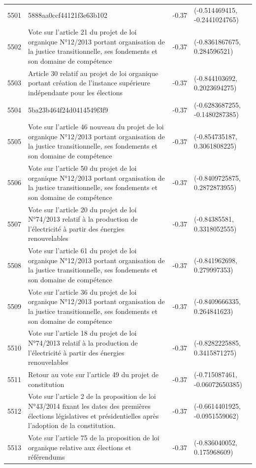 \begin{table}[ht]
\begin{tabular}{rlrl}
  5501 & 5888aa0ccf44121f3e63b102 & -0.37 & (-0.514469415, -0.2441024765) \\ 
  5502 & Vote sur l'article 21 du projet de loi organique N°12/2013 portant organisation de la justice transitionnelle, ses fondements et son domaine de compétence & -0.37 & (-0.8361867675, 0.284596521) \\ 
  5503 & Article 30 relatif au projet de loi organique portant création de l'instance supérieure indépendante pour les élections & -0.37 & (-0.844103692, 0.2023694275) \\ 
  5504 & 5ba23b464f24d0414549f3f9 & -0.37 & (-0.6283687255, -0.1480287385) \\ 
  5505 & Vote sur l'article 46 nouveau du projet de loi organique N°12/2013 portant organisation de la justice transitionnelle, ses fondements et son domaine de compétence & -0.37 & (-0.854735187, 0.3061808225) \\ 
  5506 & Vote sur l'article 50 du projet de loi organique N°12/2013 portant organisation de la justice transitionnelle, ses fondements et son domaine de compétence & -0.37 & (-0.8409725875, 0.2872873955) \\ 
  5507 & Vote sur l'article 20 du projet de loi N°74/2013 relatif à la production de l'électricité à partir des énergies renouvelables & -0.37 & (-0.84385581, 0.3318052555) \\ 
  5508 & Vote sur l'article 61 du projet de loi organique N°12/2013 portant organisation de la justice transitionnelle, ses fondements et son domaine de compétence & -0.37 & (-0.841962698, 0.279997353) \\ 
  5509 & Vote sur l'article 36 du projet de loi organique N°12/2013 portant organisation de la justice transitionnelle, ses fondements et son domaine de compétence & -0.37 & (-0.8409666335, 0.264841623) \\ 
  5510 & Vote sur l'article 18 du projet de loi N°74/2013 relatif à la production de l'électricité à partir des énergies renouvelables & -0.37 & (-0.8282225885, 0.3415871275) \\ 
  5511 & Retour au vote sur l'article 49 du projet de constitution & -0.37 & (-0.715087461, -0.06072650385) \\ 
  5512 & Vote sur l'article 2 de la proposition de loi N°43/2014 fixant les dates des premières élections législatives et présidentielles après l'adoption de la constitution. & -0.37 & (-0.6614401925, -0.0951559062) \\ 
  5513 & Vote sur l'article 75 de la proposition de loi organique relative aux élections et référendums & -0.37 & (-0.836040052, 0.175968609) \\ 

\end{tabular}
\end{table}
